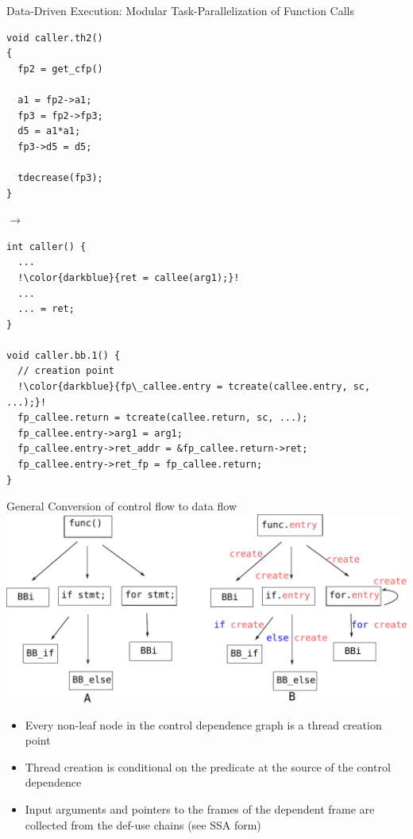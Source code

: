 \documentclass[xcolor=dvipsnames,9pt,mathserif]{beamer}
\renewcommand{\emph}[1]{\alert{#1}}
\begin{document}
\begin{frame}[fragile]{Data-Driven Execution:
    Modular Task-Parallelization of Function Calls}
  \begin{minipage}{.2\columnwidth}
    \begin{lstlisting}[escapechar=!]
void caller.th2()
{
  fp2 = get_cfp()

  a1 = fp2->a1;
  fp3 = fp2->fp3;
  d5 = a1*a1;
  fp3->d5 = d5;

  tdecrease(fp3);
}
    \end{lstlisting}
  \end{minipage}
  \qquad
  $\to$
  \qquad
   \begin{minipage}{.6\columnwidth}
  \begin{lstlisting}[escapechar=!]
int caller() {
  ...
  !\color{darkblue}{ret = callee(arg1);}!
  ...
  ... = ret;
}

void caller.bb.1() {
  // creation point
  !\color{darkblue}{fp\_callee.entry = tcreate(callee.entry, sc, ...);}!
  fp_callee.return = tcreate(callee.return, sc, ...);
  fp_callee.entry->arg1 = arg1;
  fp_callee.entry->ret_addr = &fp_callee.return->ret;
  fp_callee.entry->ret_fp = fp_callee.return;
}
 \end{lstlisting}
\end{minipage}
\end{frame}

\begin{frame}{General Conversion of control flow to data flow}
  \includegraphics[width=.8\columnwidth]{jittc.pdf}

  \begin{itemize}
  \item Every non-leaf node in the \emph{control dependence graph}
    is a thread creation point
  \item Thread creation is conditional on the predicate at the
    source of the control dependence
  \item Input arguments and pointers to the frames of the dependent
    frame are collected from the def-use chains (see SSA form)
  \end{itemize}
\end{frame}
\end{document}
